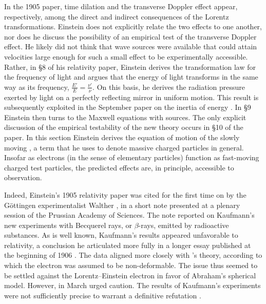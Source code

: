 \documentclass[pdflatex]{sn-jnl}
\begin{document}
In the 1905 paper, time dilation and the transverse Doppler effect appear, respectively, among the direct and indirect consequences of the Lorentz transformations. Einstein does not explicitly relate the two effects to one another, nor does he discuss the possibility of an empirical test of the transverse Doppler effect. He likely did not think that wave sources were available that could attain velocities large enough for such a small effect to be experimentally accessible. Rather, in \S8 of his relativity paper, Einstein derives the transformation law for the frequency of light and argues that the energy of light transforms in the same way as its frequency, \ie $\frac{E'}{E}=\frac{\nu'}{\nu}$. On this basis, he derives the radiation pressure exerted by light on a perfectly reflecting mirror in uniform motion. This result is subsequently exploited in the September paper on the inertia of energy \citep{Einstein1905b}. In \S9 Einstein then turns to the Maxwell equations with sources. The only explicit discussion of the empirical testability of the new theory occurs in \S10 of the paper. In this section Einstein derives the equation of motion of the slowly moving , a term that he uses to denote massive charged particles in general. Insofar as electrons (in the sense of elementary particles) function as fast-moving charged test particles, the predicted effects are, in principle, accessible to observation.

Indeed, Einstein’s 1905 relativity paper was cited for the first time on  by the Göttingen experimentalist Walther \citet[954]{Kaufmann1905}, in a short note presented at a plenary session of the Prussian Academy of Sciences. The note reported on Kaufmann’s new experiments with Becquerel rays, or $\beta$-rays, emitted by radioactive substances. As is well known, Kaufmann’s results appeared unfavorable to relativity, a conclusion he articulated more fully in a longer essay published at the beginning of 1906 \citep{Kaufmann1906}. The data aligned more closely with \Abr’s theory, according to which the electron was assumed to be non-deformable. The issue thus seemed to be settled against the Lorentz--Einstein electron in favor of Abraham’s spherical model. However, in March \citet{Planck1906a} urged caution. The results of Kaufmann’s experiments were not sufficiently precise to warrant a definitive refutation \citep{Giovanelli2024}.
\end{document}
